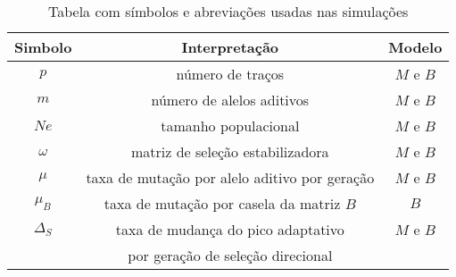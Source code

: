 \begin{table}[htbp]
    \caption[Tabela de abreviações]{Tabela com símbolos e abreviações
    usadas nas simulações}
    \label{tab:exemplo}
    \vspace{1em}
    \centering
    \begin{tabular}{c c c}
        \toprule
        Simbolo     & Interpretação & Modelo\\
        \midrule
        $p$     & número de traços & $M$ e $B$\\
        $m$     & número de alelos aditivos & $M$ e $B$\\
        $Ne$    & tamanho populacional & $M$ e $B$   \\
        $\omega$     & matriz de seleção estabilizadora & $M$ e $B$\\
        $\mu$     & taxa de mutação por alelo aditivo por geração & $M$ e $B$\\
        $\mu_B$     & taxa de mutação por casela da matriz $B$ & $B$\\
        $\Delta_S$     & taxa de mudança do pico adaptativo & $M$ e $B$\\
                       &   por geração de seleção direcional & \\

        \bottomrule
    \end{tabular}
\end{table}
